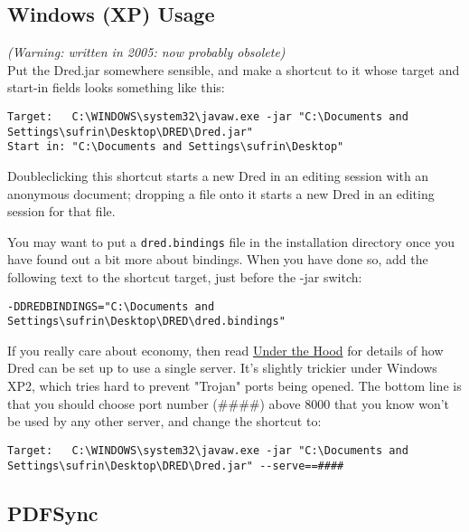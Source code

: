 \documentclass[
]{article}
\begin{document}
\hypertarget{windows-xp-usage}{%
\subsection{Windows (XP) Usage}\label{windows-xp-usage}}

\emph{(Warning: written in 2005: now probably obsolete)}\\
Put the Dred.jar somewhere sensible, and make a shortcut to it whose
target and start-in fields looks something like this:

\begin{verbatim}
Target:   C:\WINDOWS\system32\javaw.exe -jar "C:\Documents and Settings\sufrin\Desktop\DRED\Dred.jar" 
Start in: "C:\Documents and Settings\sufrin\Desktop"
\end{verbatim}

Doubleclicking this shortcut starts a new Dred in an editing session
with an anonymous document; dropping a file onto it starts a new Dred in
an editing session for that file.

You may want to put a \texttt{dred.bindings} file in the installation
directory once you have found out a bit more about bindings. When you
have done so, add the following text to the shortcut target, just before
the -jar switch:

\begin{verbatim}
-DDREDBINDINGS="C:\Documents and Settings\sufrin\Desktop\DRED\dred.bindings" 
\end{verbatim}

If you really care about economy, then read \href{Underhood.html}{Under
the Hood} for details of how Dred can be set up to use a single server.
It's slightly trickier under Windows XP2, which tries hard to prevent
"Trojan" ports being opened. The bottom line is that you should choose
port number (\#\#\#\#) above 8000 that you know won't be used by any
other server, and change the shortcut to:

\begin{verbatim}
Target:   C:\WINDOWS\system32\javaw.exe -jar "C:\Documents and Settings\sufrin\Desktop\DRED\Dred.jar" --serve==####
\end{verbatim}

\protect\hypertarget{PDFSync}{}{}

\hypertarget{pdfsync}{%
\subsection{PDFSync}\label{pdfsync}}
\end{document}
